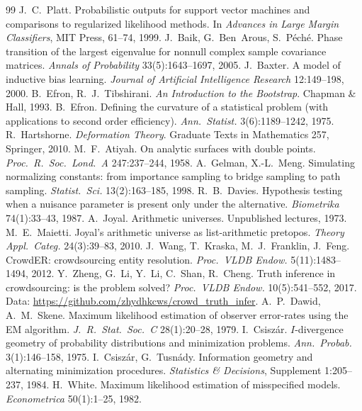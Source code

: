 \documentclass[11pt]{article}
\theoremstyle{definition}
\theoremstyle{remark}
\begin{document}
\begin{thebibliography}{99}
 J.~C.~Platt. Probabilistic outputs for support vector machines and comparisons to regularized likelihood methods. In \emph{Advances in Large Margin Classifiers}, MIT Press, 61--74, 1999.
 J.~Baik, G.~Ben~Arous, S.~P\'ech\'e. Phase transition of the largest eigenvalue for nonnull complex sample covariance matrices. \emph{Annals of Probability} 33(5):1643--1697, 2005.
 J.~Baxter. A model of inductive bias learning. \emph{Journal of Artificial Intelligence Research} 12:149--198, 2000.
 B.~Efron, R.~J.~Tibshirani. \emph{An Introduction to the Bootstrap}. Chapman \& Hall, 1993.
 B.~Efron. Defining the curvature of a statistical problem (with applications to second order efficiency). \emph{Ann.\ Statist.} 3(6):1189--1242, 1975.
 R.~Hartshorne. \emph{Deformation Theory}. Graduate Texts in Mathematics 257, Springer, 2010.
 M.~F.~Atiyah. On analytic surfaces with double points. \emph{Proc.\ R.\ Soc.\ Lond.\ A} 247:237--244, 1958.
 A.~Gelman, X.-L.~Meng. Simulating normalizing constants: from importance sampling to bridge sampling to path sampling. \emph{Statist.\ Sci.} 13(2):163--185, 1998.
 R.~B.~Davies. Hypothesis testing when a nuisance parameter is present only under the alternative. \emph{Biometrika} 74(1):33--43, 1987.
 A.~Joyal. Arithmetic universes. Unpublished lectures, 1973.
 M.~E.~Maietti. Joyal's arithmetic universe as list-arithmetic pretopos. \emph{Theory Appl.\ Categ.} 24(3):39--83, 2010.
 J.~Wang, T.~Kraska, M.~J.~Franklin, J.~Feng. CrowdER: crowdsourcing entity resolution. \emph{Proc.\ VLDB Endow.} 5(11):1483--1494, 2012.
 Y.~Zheng, G.~Li, Y.~Li, C.~Shan, R.~Cheng. Truth inference in crowdsourcing: is the problem solved? \emph{Proc.\ VLDB Endow.} 10(5):541--552, 2017. Data: \url{https://github.com/zhydhkcws/crowd_truth_infer}.
 A.~P.~Dawid, A.~M.~Skene. Maximum likelihood estimation of observer error-rates using the EM algorithm. \emph{J.\ R.\ Stat.\ Soc.\ C} 28(1):20--28, 1979.
 I.~Csisz\'ar. $I$-divergence geometry of probability distributions and minimization problems. \emph{Ann.\ Probab.} 3(1):146--158, 1975.
 I.~Csisz\'ar, G.~Tusn\'ady. Information geometry and alternating minimization procedures. \emph{Statistics \& Decisions}, Supplement 1:205--237, 1984.
 H.~White. Maximum likelihood estimation of misspecified models. \emph{Econometrica} 50(1):1--25, 1982.

\end{thebibliography}
\end{document}
